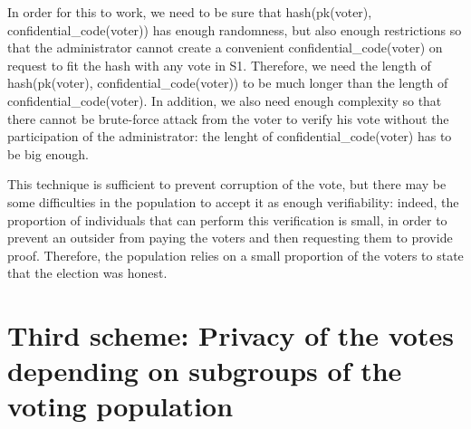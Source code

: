 \documentclass{article}
\begin{document}
In order for this to work, we need to be sure that hash(pk(voter), confidential\_code(voter)) has enough randomness, but also enough restrictions so that the administrator cannot create a convenient confidential\_code(voter) on request to fit the hash with any vote in S1. Therefore, we need the length of hash(pk(voter), confidential\_code(voter)) to be much longer than the length of confidential\_code(voter). In addition, we also need enough complexity so that there cannot be brute-force attack from the voter to verify his vote without the participation of the administrator: the lenght of confidential\_code(voter) has to be big enough.


\bigbreak

This technique is sufficient to prevent corruption of the vote, but there may be some difficulties in the population to accept it as enough verifiability: indeed, the proportion of individuals that can perform this verification is small, in order to prevent an outsider from paying the voters and then requesting them to provide proof. Therefore, the population relies on a small proportion of the voters to state that the election was honest. 


\section{Third scheme: Privacy of the votes depending on subgroups of the voting population}
\end{document}
